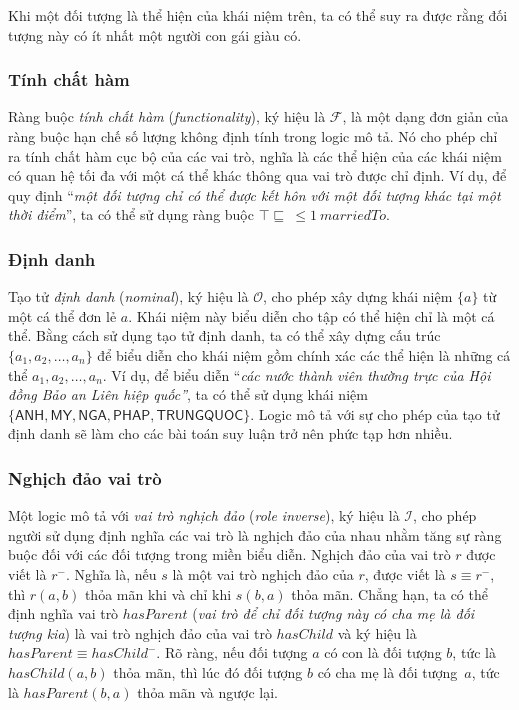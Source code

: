 \documentclass[12pt,a4paper,twoside]{report}
\newcommand{\mI}		{\mathcal{I}}
\newcommand{\mO}		{\mathcal{O}}
\newcommand{\mF}		{\mathcal{F}}
\newcommand{\hasChild}		{hasChild}
\newcommand{\hasParent}		{hasParent}
\newcommand{\marriedTo}		{marriedTo}
\newcommand{\iANH}		{\mathsf{ANH}}
\newcommand{\iPHAP}		{\mathsf{PHAP}}
\newcommand{\iMY}		{\mathsf{MY}}
\newcommand{\iNGA}		{\mathsf{NGA}}
\newcommand{\iTRUNGQUOC}{\mathsf{TRUNGQUOC}}
\theoremstyle{definition}
\begin{document}
Khi một đối tượng là thể hiện của khái niệm trên, ta có thể suy ra được rằng đối tượng này có ít nhất một người con gái giàu có.

\subsubsection{Tính chất hàm}
Ràng buộc {\em tính chất hàm} ({\em functionality}), ký hiệu là $\mF$, là một dạng đơn giản của ràng buộc hạn chế số lượng không định tính trong logic mô tả. Nó cho phép chỉ ra tính chất hàm cục bộ của các vai trò, nghĩa là các thể hiện của các khái niệm có quan hệ tối đa với một cá thể khác thông qua vai trò được chỉ định.
Ví dụ, để quy định ``\textit{một đối tượng chỉ có thể được kết hôn với một đối tượng khác tại một thời điểm}'', ta có thể sử dụng ràng buộc $\top \sqsubseteq\ \leq 1\ \marriedTo$.

\subsubsection{Định danh}
Tạo tử {\em định danh} ({\em nominal}), ký hiệu là $\mO$, cho phép xây dựng khái niệm $\{a\}$ từ một cá thể đơn lẻ $a$. Khái niệm này biểu diễn cho tập có thể hiện chỉ là một cá thể. Bằng cách sử dụng tạo tử định danh, ta có thể xây dựng cấu trúc $\{a_1, a_2, \ldots, a_n\}$ để biểu diễn cho khái niệm gồm chính xác các thể hiện là những cá thể $a_1, a_2, \ldots, a_n$.
Ví dụ, để biểu diễn ``\textit{các nước thành viên thường trực của Hội đồng Bảo an Liên hiệp quốc''}, ta có thể sử dụng khái niệm $\{\iANH, \iMY, \iNGA, \iPHAP, \iTRUNGQUOC\}$.
Logic mô tả với sự cho phép của tạo tử định danh sẽ làm cho các bài toán suy luận trở nên phức tạp hơn nhiều.

\subsubsection{Nghịch đảo vai trò}
Một logic mô tả với {\em vai trò nghịch đảo} ({\em role inverse}), ký hiệu là $\mI$, cho phép người sử dụng định nghĩa các vai trò là nghịch đảo của nhau nhằm tăng sự ràng buộc đối với các đối tượng trong miền biểu diễn. Nghịch đảo của vai trò $r$ được viết là $r^-$. Nghĩa là, nếu $s$ là một vai trò nghịch đảo của $r$, được viết là $s \equiv r^-$, thì $r(a, b)$ thỏa mãn khi và chỉ khi $s(b,a)$ thỏa mãn. Chẳng hạn, ta có thể định nghĩa vai trò $\hasParent$ ({\em vai trò để chỉ đối tượng này có cha mẹ là đối tượng kia}) là vai trò nghịch đảo của vai trò $\hasChild$ và ký hiệu là $\hasParent \equiv \hasChild^-$. Rõ ràng, nếu đối tượng $a$ có con là đối tượng $b$, tức là $\hasChild(a,b)$ thỏa mãn, thì lúc đó đối tượng $b$ có cha mẹ là đối tượng~$a$, tức là $\hasParent(b,a)$ thỏa mãn và ngược lại.
\end{document}
